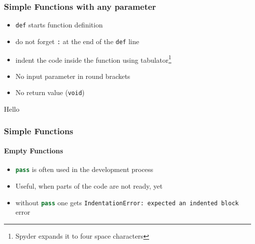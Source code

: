 \documentclass[ngerman]{beamer}
\newcommand{\ta}[1]{\textattachfile[color=1 0 0]{#1}{Code}}
\begin{document}
%
%
%
%
%


\begin{frame}[containsverbatim]
\frametitle{Simple Functions with any parameter}

\begin{itemize}
	\item \texttt{def} starts function definition
	\item do not forget \texttt{:} at the end of the \texttt{def} line
	\item indent the code inside the function using tabulator\footnote{Spyder expands it to four space characters}
	\item No input parameter in round brackets
	\item No return value (\texttt{void})
\end{itemize}



\begin{ausgabe}
Hello
\end{ausgabe}

\end{frame}

\begin{frame}[containsverbatim]
\frametitle{Simple Functions}
\framesubtitle{Empty Functions}

\begin{itemize}
\item \lstinline[language={Python}]{pass} is often used in the development process
\item Useful, when parts of the code are not ready, yet
\item without \lstinline[language={Python}]{pass} one gets \texttt{IndentationError: expected an indented block} error
\end{itemize}



\end{frame}
\end{document}

